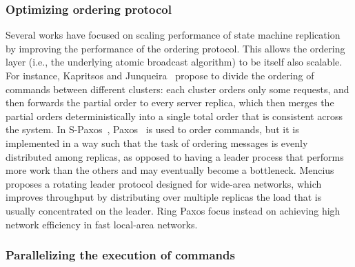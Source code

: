 \subsubsection{Optimizing ordering protocol}

Several works have focused on scaling performance of state machine replication
by improving the performance of the ordering protocol. This allows the ordering
layer (i.e., the underlying atomic broadcast algorithm) to be itself also
scalable. For instance, Kapritsos and Junqueira~\cite{kapritsos2010scalable}
propose to divide the ordering of commands between different clusters: each
cluster orders only some requests, and then forwards the partial order to every
server replica, which then merges the partial orders deterministically into a
single total order that is consistent across the system. In
S-Paxos~\cite{biely2012spaxos}, Paxos~\cite{Lam98} is used to order commands,
but it is implemented in a way such that the task of ordering messages is evenly
distributed among replicas, as opposed to having a leader process that performs
more work than the others and may eventually become a bottleneck. Mencius
\cite{Mencius} proposes a rotating leader protocol designed for wide-area
networks, which improves throughput by distributing over multiple replicas the
load that is usually concentrated on the leader. Ring Paxos
\cite{Marandi:2012hb} focus instead on achieving high network efficiency in fast
local-area networks. 

\subsubsection{Parallelizing the execution of commands}

